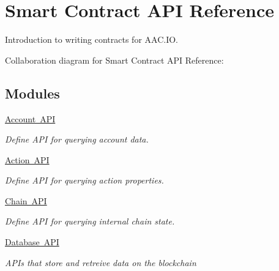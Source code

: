 \hypertarget{group__contractdev}{}\section{Smart Contract A\+PI Reference}
\label{group__contractdev}


Introduction to writing contracts for A\+A\+C.\+IO.  


Collaboration diagram for Smart Contract A\+PI Reference\+:
\subsection*{Modules}
\begin{DoxyCompactItemize}
\item 
\mbox{\hyperlink{group__accountapi}{Account A\+PI}}
\begin{DoxyCompactList}\small\item\em Define A\+PI for querying account data. \end{DoxyCompactList}\item 
\mbox{\hyperlink{group__actionapi}{Action A\+PI}}
\begin{DoxyCompactList}\small\item\em Define A\+PI for querying action properties. \end{DoxyCompactList}\item 
\mbox{\hyperlink{group__chainapi}{Chain A\+PI}}
\begin{DoxyCompactList}\small\item\em Define A\+PI for querying internal chain state. \end{DoxyCompactList}\item 
\mbox{\hyperlink{group__database}{Database A\+PI}}
\begin{DoxyCompactList}\small\item\em A\+P\+Is that store and retreive data on the blockchain


\end{DoxyCompactList}
\end{DoxyCompactItemize}
